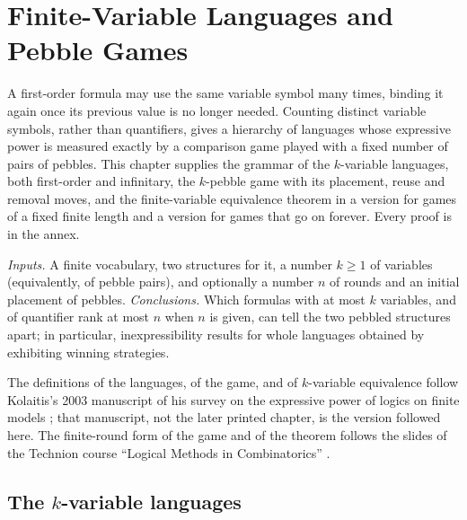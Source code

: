 \chapter{Finite-Variable Languages and Pebble Games}
\label{sec:p03-w03-p03-056-pebble}

A first-order formula may use the same variable symbol many times, binding
it again once its previous value is no longer needed. Counting distinct
variable symbols, rather than quantifiers, gives a hierarchy of languages
whose expressive power is measured exactly by a comparison game played with
a fixed number of pairs of pebbles. This chapter supplies the grammar of the
\(k\)-variable languages, both first-order and infinitary, the \(k\)-pebble
game with its placement, reuse and removal moves, and the finite-variable
equivalence theorem in a version for games of a fixed finite length and a
version for games that go on forever. Every proof is in the annex.

\emph{Inputs.} A finite vocabulary, two structures for it, a number \(k\geq1\)
of variables (equivalently, of pebble pairs), and optionally a number \(n\)
of rounds and an initial placement of pebbles.
\emph{Conclusions.} Which formulas with at most \(k\) variables, and of
quantifier rank at most \(n\) when \(n\) is given, can tell the two pebbled
structures apart; in particular, inexpressibility results for whole languages
obtained by exhibiting winning strategies.

The definitions of the languages, of the game, and of \(k\)-variable
equivalence follow Kolaitis's 2003 manuscript of his survey on the
expressive power of logics on finite models
\cite[pp.~3--4, 52--59]{Kolaitis2003ExpressivePowerNotes}; that
manuscript, not the later printed chapter, is the version followed here.
The finite-round form of the game and of the theorem follows the slides of
the Technion course ``Logical Methods in Combinatorics''
\cite[pp.~10--13]{TechnionLMC2009Lecture4}.

\section{The \(k\)-variable languages}
\label{sec:p03-w03-p03-056-languages}

